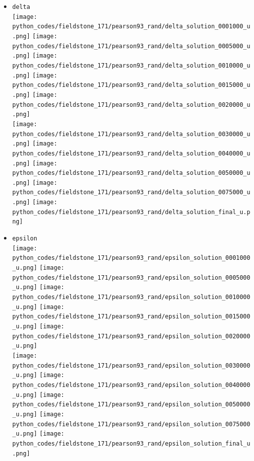 \begin{itemize}
\item {\tt delta}\\
\texttt{[image: python\_codes/fieldstone\_171/pearson93\_rand/delta\_solution\_0001000\_u.png]}
\texttt{[image: python\_codes/fieldstone\_171/pearson93\_rand/delta\_solution\_0005000\_u.png]}
\texttt{[image: python\_codes/fieldstone\_171/pearson93\_rand/delta\_solution\_0010000\_u.png]}
\texttt{[image: python\_codes/fieldstone\_171/pearson93\_rand/delta\_solution\_0015000\_u.png]}
\texttt{[image: python\_codes/fieldstone\_171/pearson93\_rand/delta\_solution\_0020000\_u.png]}\\
\texttt{[image: python\_codes/fieldstone\_171/pearson93\_rand/delta\_solution\_0030000\_u.png]}
\texttt{[image: python\_codes/fieldstone\_171/pearson93\_rand/delta\_solution\_0040000\_u.png]}
\texttt{[image: python\_codes/fieldstone\_171/pearson93\_rand/delta\_solution\_0050000\_u.png]}
\texttt{[image: python\_codes/fieldstone\_171/pearson93\_rand/delta\_solution\_0075000\_u.png]}
\texttt{[image: python\_codes/fieldstone\_171/pearson93\_rand/delta\_solution\_final\_u.png]}

\item {\tt epsilon}\\
\texttt{[image: python\_codes/fieldstone\_171/pearson93\_rand/epsilon\_solution\_0001000\_u.png]}
\texttt{[image: python\_codes/fieldstone\_171/pearson93\_rand/epsilon\_solution\_0005000\_u.png]}
\texttt{[image: python\_codes/fieldstone\_171/pearson93\_rand/epsilon\_solution\_0010000\_u.png]}
\texttt{[image: python\_codes/fieldstone\_171/pearson93\_rand/epsilon\_solution\_0015000\_u.png]}
\texttt{[image: python\_codes/fieldstone\_171/pearson93\_rand/epsilon\_solution\_0020000\_u.png]}\\
\texttt{[image: python\_codes/fieldstone\_171/pearson93\_rand/epsilon\_solution\_0030000\_u.png]}
\texttt{[image: python\_codes/fieldstone\_171/pearson93\_rand/epsilon\_solution\_0040000\_u.png]}
\texttt{[image: python\_codes/fieldstone\_171/pearson93\_rand/epsilon\_solution\_0050000\_u.png]}
\texttt{[image: python\_codes/fieldstone\_171/pearson93\_rand/epsilon\_solution\_0075000\_u.png]}
\texttt{[image: python\_codes/fieldstone\_171/pearson93\_rand/epsilon\_solution\_final\_u.png]}


\end{itemize}
